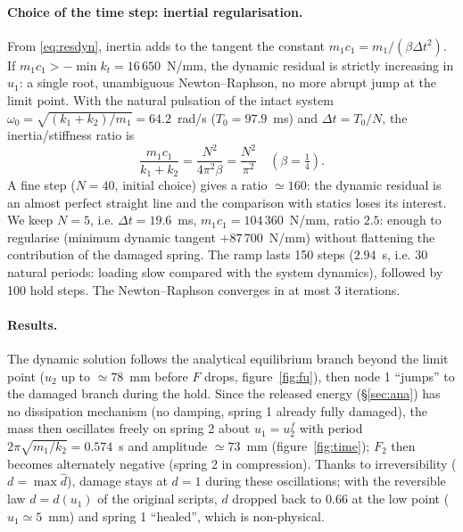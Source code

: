 \documentclass[11pt,a4paper]{article}
\begin{document}
\paragraph{Choice of the time step: inertial regularisation.}
From \eqref{eq:resdyn}, inertia adds to the tangent the constant $m_1c_1 = m_1/(\beta\Delta t^2)$.
If $m_1c_1 > -\min k_t = 16\,650$~N/mm, the dynamic residual is strictly increasing in $u_1$: a
single root, unambiguous Newton--Raphson, no more abrupt jump at the limit point. With the
natural pulsation of the intact system $\omega_0=\sqrt{(k_1+k_2)/m_1} = 64.2$~rad/s
($T_0 = 97.9$~ms) and $\Delta t = T_0/N$, the inertia/stiffness ratio is
\begin{equation}
  \frac{m_1c_1}{k_1+k_2} = \frac{N^2}{4\pi^2\beta} = \frac{N^2}{\pi^2}\quad(\beta=\tfrac14).
\end{equation}
A fine step ($N=40$, initial choice) gives a ratio $\simeq160$: the dynamic residual is an
almost perfect straight line and the comparison with statics loses its interest. We keep
$N=5$, i.e. $\Delta t = 19.6$~ms, $m_1c_1 = 104\,360$~N/mm, ratio $2.5$: enough to regularise
(minimum dynamic tangent $+87\,700$~N/mm) without flattening the contribution of the damaged
spring. The ramp lasts 150 steps ($2.94$~s, i.e. 30 natural periods: loading slow compared with
the system dynamics), followed by 100 hold steps. The Newton--Raphson converges in at most 3
iterations.

\paragraph{Results.}
The dynamic solution follows the analytical equilibrium branch beyond the limit point ($u_2$ up
to $\simeq78$~mm before $F$ drops, figure~\ref{fig:fu}), then node 1 ``jumps'' to the damaged
branch during the hold. Since the released energy (\S\ref{sec:ana}) has no dissipation
mechanism (no damping, spring 1 already fully damaged), the mass then oscillates freely on
spring 2 about $u_1 = u_2^f$ with period $2\pi\sqrt{m_1/k_2} = 0.574$~s and amplitude
$\simeq73$~mm (figure~\ref{fig:time}); $F_2$ then becomes alternately negative (spring 2 in
compression). Thanks to irreversibility ($d = \max\hat d$), damage stays at $d=1$ during these
oscillations; with the reversible law $d=d(u_1)$ of the original scripts, $d$ dropped back to
$0.66$ at the low point ($u_1\simeq5$~mm) and spring 1 ``healed'', which is non-physical.
\end{document}
